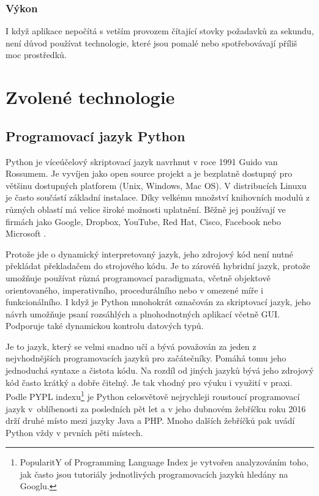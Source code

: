 \subsubsection*{Výkon}
I když aplikace nepočítá s vetším provozem čítající stovky požadavků za sekundu, není důvod používat technologie, které jsou pomalé
nebo spotřebovávají příliš moc prostředků.

\section{Zvolené technologie}

\subsection{Programovací jazyk Python}

Python\cite{python} je víceúčelový skriptovací jazyk navrhnut v roce 1991 \cite{python-year} Guido van Rossumem.
Je vyvíjen jako open source projekt a je bezplatně dostupný pro většinu dostupných platforem (Unix, Windows, Mac OS).
V distribucích Linuxu je často součástí základní instalace. Díky velkému množství knihovních modulů z různých oblastí
má velice široké možnosti uplatnění. Běžně jej používají ve firmách jako Google, Dropbox, YouTube, Red Hat, Cisco,
Facebook nebo Microsoft \cite{python-companies}.

Protože jde o dynamický interpretovaný jazyk, jeho zdrojový kód není nutné překládat překladačem do strojového kódu.
Je to zárovéň hybridní jazyk, protože umožňuje používat různá programovací paradigmata, včetně objektově orientovaného,
imperativního, procedurálního nebo v omezené míře i funkcionálního. I když je Python mnohokrát označován za skriptovací jazyk,
jeho návrh umožňuje psaní rozsáhlých a plnohodnotných aplikací včetně GUI. Podporuje také dynamickou kontrolu datových typů.

Je to jazyk, který se velmi snadno učí a bývá považován za jeden z nejvhodnějších programovacích jazyků pro začátečníky.
Pomáhá tomu jeho jednoduchá syntaxe a čistota kódu. Na rozdíl od jiných jazyků bývá jeho zdrojový kód často krátký a dobře čitelný.
Je tak vhodný pro výuku i využití v praxi. Podle PYPL indexu\footnote{PopularitY of Programming Language Index je vytvořen analyzováním toho,
jak často jsou tutoriály jednotlivých programovacích jazyků hledány na Googlu.} je Python celosvětově nejrychleji roustoucí programovací jazyk
v~oblíbenosti za posledních pět let \cite{python-pypl} a v jeho dubnovém žebříčku roku 2016 drží druhé místo mezi jazyky Java a PHP.
Mnoho dalších žebříčků pak uvádí Python vždy v prvních pěti místech.


